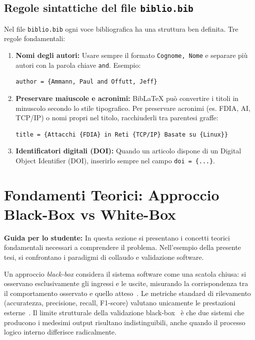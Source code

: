 \subsection{Regole sintattiche del file \texttt{biblio.bib}}
Nel file \texttt{biblio.bib} ogni voce bibliografica ha una struttura ben definita. Tre regole fondamentali:
\begin{enumerate}
    \item \textbf{Nomi degli autori:} Usare sempre il formato \texttt{Cognome, Nome} e separare più autori con la parola chiave \texttt{and}. Esempio:
\begin{lstlisting}[language=TeX]
author = {Ammann, Paul and Offutt, Jeff}
\end{lstlisting}
    \item \textbf{Preservare maiuscole e acronimi:} BibLaTeX può convertire i titoli in minuscolo secondo lo stile tipografico. Per preservare acronimi (es. FDIA, AI, TCP/IP) o nomi propri nel titolo, racchiuderli tra parentesi graffe:
\begin{lstlisting}[language=TeX]
title = {Attacchi {FDIA} in Reti {TCP/IP} Basate su {Linux}}
\end{lstlisting}
    \item \textbf{Identificatori digitali (DOI):} Quando un articolo dispone di un Digital Object Identifier (DOI), inserirlo sempre nel campo \texttt{doi = \{...\}}.
\end{enumerate}


\section{Fondamenti Teorici: Approccio Black-Box vs White-Box}
\label{sec:black-white}

\textbf{Guida per lo studente:} In questa sezione si presentano i concetti teorici fondamentali necessari a comprendere il problema. Nell'esempio della presente tesi, si confrontano i paradigmi di collaudo e validazione software.

Un approccio \emph{black-box} considera il sistema software come una scatola chiusa: si osservano esclusivamente gli ingressi e le uscite, misurando la corrispondenza tra il comportamento osservato e quello atteso~\cite{gunning2019xai}. Le metriche standard di rilevamento (accuratezza, precisione, recall, F1-score) valutano unicamente le prestazioni esterne~\cite{powers2020evaluation}. Il limite strutturale della validazione black-box~\cite{ammann2016introduction} è che due sistemi che producono i medesimi output risultano indistinguibili, anche quando il processo logico interno differisce radicalmente.

